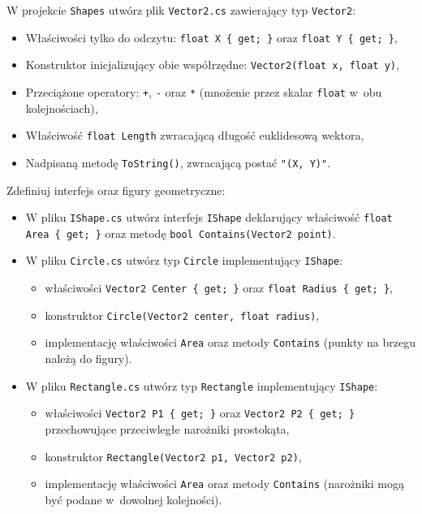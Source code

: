 \documentclass[11pt,a4paper,addpoints]{exam}
\begin{document}
\begin{questions}

\question[1]
W projekcie \texttt{Shapes} utwórz plik \texttt{Vector2.cs} zawierający typ \texttt{Vector2}:
\begin{itemize}
    \item Właściwości tylko do odczytu: \texttt{float X \{ get; \}} oraz \texttt{float Y \{ get; \}},
    \item Konstruktor inicjalizujący obie współrzędne: \texttt{Vector2(float x, float y)},
    \item Przeciążone operatory: \texttt{+}, \texttt{-} oraz \texttt{*} (mnożenie przez skalar \texttt{float} w~obu kolejnościach),
    \item Właściwość \texttt{float Length} zwracającą długość euklidesową wektora,
    \item Nadpisaną metodę \texttt{ToString()}, zwracającą postać \texttt{"(X, Y)"}.
\end{itemize}

\question[2]
Zdefiniuj interfejs oraz figury geometryczne:
\begin{itemize}
    \item W pliku \texttt{IShape.cs} utwórz interfejs \texttt{IShape} deklarujący właściwość \texttt{float Area \{ get; \}} oraz metodę \texttt{bool Contains(Vector2 point)}.
    \item W pliku \texttt{Circle.cs} utwórz typ \texttt{Circle} implementujący \texttt{IShape}:
    \begin{itemize}
        \item właściwości \texttt{Vector2 Center \{ get; \}} oraz \texttt{float Radius \{ get; \}},
        \item konstruktor \texttt{Circle(Vector2 center, float radius)},
        \item implementację właściwości \texttt{Area} oraz metody \texttt{Contains} (punkty na brzegu należą do figury).
    \end{itemize}
    \item W pliku \texttt{Rectangle.cs} utwórz typ \texttt{Rectangle} implementujący \texttt{IShape}:
    \begin{itemize}
        \item właściwości \texttt{Vector2 P1 \{ get; \}} oraz \texttt{Vector2 P2 \{ get; \}} przechowujące przeciwległe narożniki prostokąta,
        \item konstruktor \texttt{Rectangle(Vector2 p1, Vector2 p2)},
        \item implementację właściwości \texttt{Area} oraz metody \texttt{Contains} (narożniki mogą być podane w~dowolnej kolejności).
    \end{itemize}
\end{itemize}


\end{questions}
\end{document}
